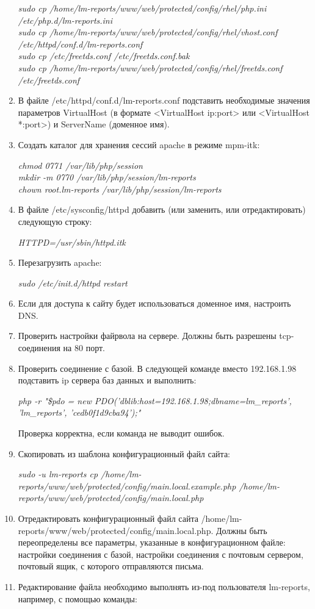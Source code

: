 \begin{enumerate}
{\textit{sudo cp /home/lm-reports/www/web/protected/config/rhel/php.ini /etc/php.d/lm-reports.ini\\
sudo cp /home/lm-reports/www/web/protected/config/rhel/vhost.conf /etc/httpd/conf.d/lm-reports.conf\\
sudo cp /etc/freetds.conf /etc/freetds.conf.bak\\
sudo cp /home/lm-reports/www/web/protected/config/rhel/freetds.conf /etc/freetds.conf
}
}
\item{
В файле /etc/httpd/conf.d/lm-reports.conf подставить необходимые значения параметров VirtualHost (в формате <VirtualHost ip:port> или <VirtualHost *:port>) и ServerName (доменное имя).
}
\item{
Создать каталог для хранения сессий apache в режиме mpm-itk:

\textit{chmod 0771 /var/lib/php/session\\
mkdir -m 0770 /var/lib/php/session/lm-reports\\
chown root.lm-reports /var/lib/php/session/lm-reports
}
}
\item{
В файле /etc/sysconfig/httpd добавить (или заменить, или отредактировать) следующую строку:

\textit{HTTPD=/usr/sbin/httpd.itk
}
}
\item{
Перезагрузить apache:

\textit{sudo /etc/init.d/httpd restart
}
}
\item{
Если для доступа к сайту будет использоваться доменное имя, настроить DNS.
}
\item{
Проверить настройки файрвола на сервере. Должны быть разрешены tcp-соединения на 80 порт. 
}
\item{
Проверить соединение с базой. В следующей команде вместо 192.168.1.98 подставить ip сервера баз данных и выполнить:

\textit{php -r "\$pdo = new PDO('dblib:host=192.168.1.98;dbname=lm\_reports', 'lm\_reports', 'cedb0f1d9cba94');"
}

Проверка корректна, если команда не выводит ошибок.
}
\item{
Скопировать из шаблона конфигурационный файл сайта:

\textit{sudo -u lm-reports cp /home/lm-reports/www/web/protected/config/main.local.example.php /home/lm-reports/www/web/protected/config/main.local.php
}
}
\item{
Отредактировать конфигурационный файл сайта /home/lm-reports/www/web/protected/config/main.local.php. Должны быть переопределены все параметры, указанные в конфигурационном файле: настройки соединения с базой, настройки соединения с почтовым сервером, почтовый ящик, с которого отправляются письма.
}
\item{
Редактирование файла необходимо выполнять из-под пользователя lm-reports, например, с помощью команды:

}
\end{enumerate}

